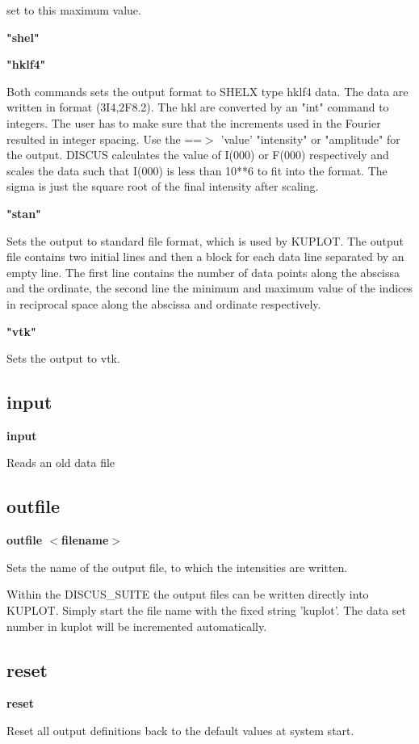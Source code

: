 set to this maximum value. 
\par
{\bf "shel" \par }
{\bf "hklf4" \par }
\vspace{3pt}
Both commands sets the output format to SHELX type hklf4 data. The 
data are written in format (3I4,2F8.2). 
The hkl are converted by an "int" command to integers. The 
user has to make sure that the increments used in the Fourier 
resulted in integer spacing. Use the ==$> $ 'value' "intensity" or 
"amplitude" for the output.  DISCUS calculates the value of I(000) or 
F(000) respectively and scales the data such that I(000) is less than 
10**6 to fit into the format. The sigma is just the square root of the 
final intensity after scaling. 
\par
{\bf "stan" \par }
\vspace{3pt}
Sets the output to standard file format, which is used by KUPLOT. 
The output file contains two initial lines and then a block for each 
data line separated by an empty line. The first line contains the 
number of data points along the abscissa and the ordinate, the 
second line the minimum and maximum value of the indices in reciprocal 
space along the abscissa and ordinate respectively. 
{\bf "vtk" \par }
\vspace{3pt}
Sets the output to vtk. 
\subsection*{input}
{\bf input \par }
\par
\vspace{3pt}
Reads an old data file 
\subsection*{outfile}
{\bf outfile $ <$filename$> $ \par }
\par
\vspace{3pt}
Sets the name of the output file, to which the intensities are written. 
\par
Within the DISCUS\_SUITE the output files can be written directly into 
KUPLOT. Simply start the file name with the fixed string 'kuplot'. 
The data set number in kuplot will be incremented automatically. 
\subsection*{reset}
{\bf reset \par }
\par
\vspace{3pt}
Reset all output definitions back to the default values at 
system start. 
